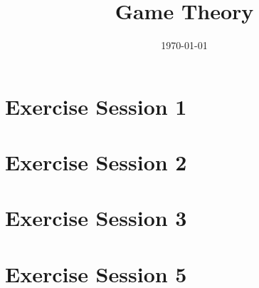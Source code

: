 \documentclass[a4paper, 11pt, oneside]{article}
\title{Game Theory}
\date{\today}
\author{}
\numberwithin{question}{section}
\theoremstyle{definition}
\numberwithin{solution}{section}
\begin{document}
\maketitle
\newpage

\tableofcontents
\newpage

\section{Exercise Session 1}


\section{Exercise Session 2}


\section{Exercise Session 3}


\section{Exercise Session 5}

\end{document}
